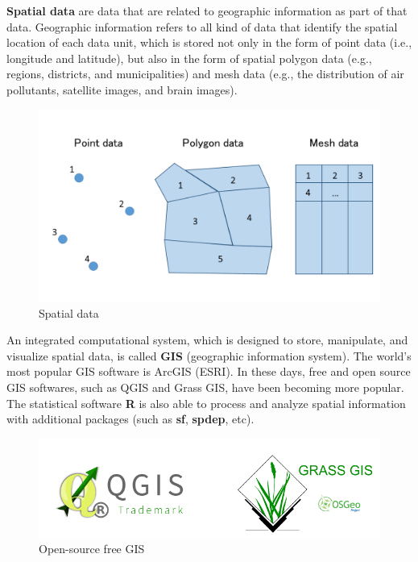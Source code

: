 \documentclass[10.5pt, A4paper, openany, uplatex]{book}
\numberwithin{equation}{section}
\begin{document}
\textbf{Spatial data} are data that are related to geographic information as part of that data. 
Geographic information refers to all kind of data that identify the spatial location of each data unit, which is stored not only in the form of point data (i.e., longitude and latitude), but also in the form of spatial polygon data (e.g., regions, districts, and municipalities) and mesh data (e.g., the distribution of air pollutants, satellite images, and brain images).
\begin{figure}[h!]
	\begin{center}
		\includegraphics[width = 12cm]{spdata.png}
		\caption{Spatial data\label{fig:spdata}}
	\end{center}
\end{figure}

An integrated computational system, which is designed to store, manipulate, and visualize spatial data, is called \textbf{GIS} (geographic information system). 
 The world's most popular GIS software is ArcGIS (ESRI).
 In these days, free and open source GIS softwares, such as QGIS and Grass GIS, have been becoming more popular.  
The statistical software \textbf{R} is also able to process and analyze spatial information with additional packages (such as \textbf{sf}, \textbf{spdep}, etc).

\begin{figure}[h!]
	\begin{center}
		\includegraphics[width = 12cm]{GIS.png}
		\caption{Open-source free GIS\label{fig:GIS}}
	\end{center}
\end{figure}
\end{document}
